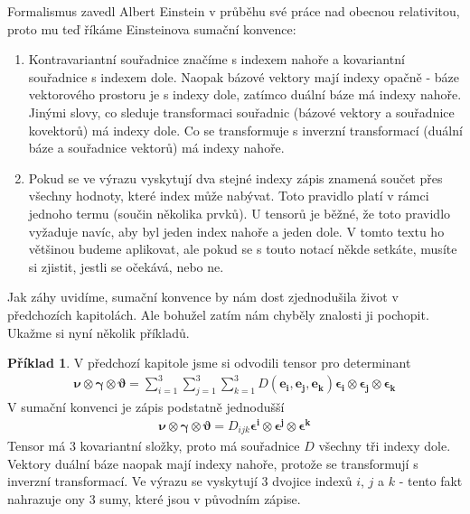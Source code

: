 \documentclass[a5paper,12pt]{amsbook}
\theoremstyle{definition}
\newtheorem{example}{Příklad}[chapter]
\newcommand{\myvec}[1]{\bm{#1}}
\begin{document}
Formalismus zavedl Albert Einstein v průběhu své práce nad obecnou relativitou, proto mu teď
říkáme Einsteinova sumační konvence:
\begin{enumerate}
  \item Kontravariantní souřadnice značíme s indexem nahoře a kovariantní souřadnice s indexem dole.
    Naopak bázové vektory mají indexy opačně - báze vektorového prostoru je s indexy dole, zatímco
    duální báze má indexy nahoře. Jinými slovy, co sleduje transformaci souřadnic (bázové vektory
    a souřadnice kovektorů) má indexy dole. Co se transformuje s inverzní transformací (duální
    báze a souřadnice vektorů) má indexy nahoře.
  \item Pokud se ve výrazu vyskytují dva stejné indexy zápis znamená součet přes všechny hodnoty,
    které index může nabývat. Toto pravidlo platí v rámci jednoho termu (součin několika prvků).
    U tensorů je běžné, že toto pravidlo vyžaduje navíc, aby byl jeden index nahoře a jeden
    dole. V tomto textu ho většinou budeme aplikovat, ale pokud se s touto notací někde setkáte,
    musíte si zjistit, jestli se očekává, nebo ne.
\end{enumerate}
Jak záhy uvidíme, sumační konvence by nám dost zjednodušila život v předchozích kapitolách.
Ale bohužel zatím nám chyběly znalosti ji pochopit. Ukažme si nyní několik příkladů.

\begin{example}
V předchozí kapitole jsme si odvodili tensor pro determinant
\begin{equation*}
\begin{split}
\myvec{\nu}\otimes\myvec{\gamma}\otimes\myvec{\vartheta} =
\sum_{i=1}^{3}\sum_{j=1}^{3}\sum_{k=1}^{3} D(\myvec{e_i}, \myvec{e_j}, \myvec{e_k})
\myvec{\epsilon_i}\otimes\myvec{\epsilon_j}\otimes\myvec{\epsilon_k}
\end{split}
\end{equation*}
V sumační konvenci je zápis podstatně jednodušší
\begin{equation*}
\begin{split}
\myvec{\nu}\otimes\myvec{\gamma}\otimes\myvec{\vartheta} = D_{ijk}
  \myvec{\epsilon^i}\otimes\myvec{\epsilon^j}\otimes\myvec{\epsilon^k}
\end{split}
\end{equation*}
Tensor má 3 kovariantní složky, proto má souřadnice $D$ všechny tři indexy dole. Vektory
duální báze naopak mají indexy nahoře, protože se transformují s inverzní transformací.
Ve výrazu se vyskytují 3 dvojice indexů $i$, $j$ a $k$ - tento fakt nahrazuje ony 3 sumy,
které jsou v původním zápise.
\end{example}
\end{document}
